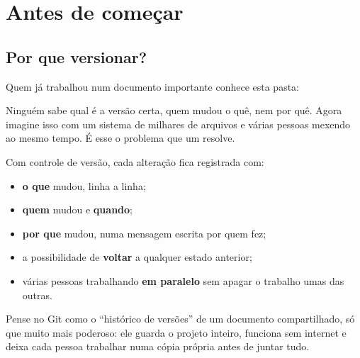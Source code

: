 \chapter{Antes de começar}
\label{cap:antes}

\section{Por que versionar?}

Quem já trabalhou num documento importante conhece esta pasta:

\begin{center}
\end{center}

Ninguém sabe qual é a versão certa, quem mudou o quê, nem por quê. Agora imagine isso com um sistema de milhares de arquivos e várias pessoas mexendo ao mesmo tempo. É esse o problema que um  resolve.

Com controle de versão, cada alteração fica registrada com:

\begin{itemize}
  \item \textbf{o que} mudou, linha a linha;
  \item \textbf{quem} mudou e \textbf{quando};
  \item \textbf{por que} mudou, numa mensagem escrita por quem fez;
  \item a possibilidade de \textbf{voltar} a qualquer estado anterior;
  \item várias pessoas trabalhando \textbf{em paralelo} sem apagar o trabalho umas das outras.
\end{itemize}

\begin{analogia}
Pense no Git como o \enquote{histórico de versões} de um documento compartilhado, só que muito mais poderoso: ele guarda o projeto inteiro, funciona sem internet e deixa cada pessoa trabalhar numa cópia própria antes de juntar tudo.
\end{analogia}

